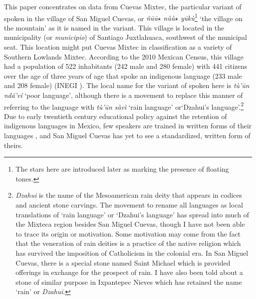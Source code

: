 \documentclass[output=paper,modfonts,nonflat]{langsci/langscibook}
\begin{document}
This paper concentrates on data from Cuevas Mixtec, the particular variant of  spoken in the village of San Miguel Cuevas, or \textit{\~n\=u\=u$\star$ n\`u\`u$\star$ y\=uk\`u}\footnote{The stars here are introduced later as marking the presence of floating tones.} `the village on the mountain' as it is named in the variant.  This village is located in the municipality (or \textit{municipio}) of Santiago Juxtlahuaca, southwest of the municipal seat.  This location might put Cuevas Mixtec in  classification as a variety of Southern Lowlands Mixtec.  According to the 2010 Mexican Census, this village had a population of 522 inhabitants (242 male and 280 female) with 441 citizens over the age of three years of age that spoke an indigenous language (233 male and 208 female) (INEGI \citeyear{inegi2010}).  The local name for the variant of  spoken here is \textit{t\`u'\=un nd\'a'v\'i} `poor language', although there is a movement to replace this manner of referring to the language with \textit{t\`u'\=un s\`av\`i} `rain language' or\linebreak\newpage\noindent `Dzahui's language'.\footnote{\textit{Dzahui} is the name of the Mesoamerican rain deity that appears in  codices and ancient stone carvings.  The movement to rename all  languages as local translations of `rain language' or `Dzahui's language' has spread into much of the Mixteca region besides San Miguel Cuevas, though I have not been able to trace its origin or motivation.  Some motivation may come from the fact that the veneration of rain deities is a practice of the native  religion which has survived the imposition of Catholicism in the colonial era.  In San Miguel Cuevas, there is a special stone named Saint Michael which is provided offerings in exchange for the prospect of rain.  I have also been told about a stone of similar purpose in Ixpantepec Nieves which has retained the name `rain' or \textit{Dzahui}.}  Due to early twentieth century educational policy against the retention of indigenous languages in Mexico, few  speakers are trained in written forms of their languages \citep[29]{VelascoOrtiz2005}, and San Miguel Cuevas has yet to see a standardized, written form of theirs.
\end{document}
